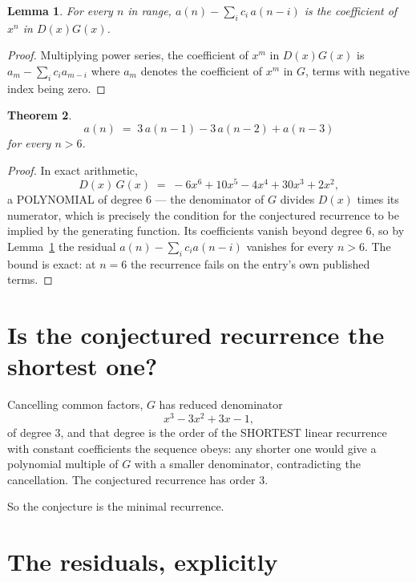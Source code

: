 \documentclass[11pt,a4paper]{article}
\theoremstyle{plain}
\newtheorem{theorem}{Theorem}
\newtheorem{lemma}[theorem]{Lemma}
\theoremstyle{definition}
\begin{document}
\begin{lemma}\label{lem:key}
For every $n$ in range, $a(n)-\sum_i c_i\,a(n-i)$ is the coefficient of $x^{n}$ in
$D(x)G(x)$.
\end{lemma}

\begin{proof}
Multiplying power series, the coefficient of $x^{m}$ in $D(x)G(x)$ is
$a_m-\sum_i c_i a_{m-i}$ where $a_m$ denotes the coefficient of $x^{m}$ in $G$, terms with
negative index being zero.
\end{proof}

\begin{theorem}
\[
a(n)\;=\;3\,a(n-1) - 3\,a(n-2) + a(n-3)
\]
for every $n>6$.
\end{theorem}

\begin{proof}
In exact arithmetic,
\[
D(x)\,G(x)\;=\;- 6 x^{6} + 10 x^{5} - 4 x^{4} + 30 x^{3} + 2 x^{2},
\]
a POLYNOMIAL of degree $6$ --- the denominator of $G$ divides $D(x)$ times its numerator,
which is precisely the condition for the conjectured recurrence to be implied by the
generating function. Its coefficients vanish beyond degree $6$, so by
Lemma~\ref{lem:key} the residual $a(n)-\sum_ic_ia(n-i)$ vanishes for every
$n>6$. The bound is exact: at $n=6$ the recurrence fails on the entry's own published terms.
\end{proof}

\section{Is the conjectured recurrence the shortest one?}

Cancelling common factors, $G$ has reduced denominator
\[
x^{3} - 3 x^{2} + 3 x - 1,
\]
of degree $3$, and that degree is the order of the SHORTEST linear recurrence with
constant coefficients the sequence obeys: any shorter one would give a polynomial multiple of
$G$ with a smaller denominator, contradicting the cancellation. The conjectured recurrence has
order $3$.

So the conjecture is the minimal recurrence.

\section{The residuals, explicitly}
\end{document}

